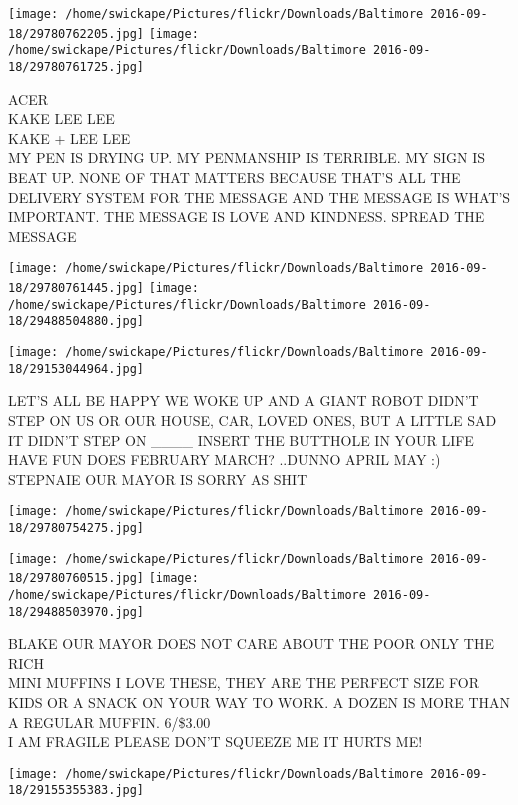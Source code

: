 \documentclass[10pt,letterpaper]{article}
\begin{document}
\texttt{[image: /home/swickape/Pictures/flickr/Downloads/Baltimore 2016-09-18/29780762205.jpg]}
\texttt{[image: /home/swickape/Pictures/flickr/Downloads/Baltimore 2016-09-18/29780761725.jpg]}

ACER\\
KAKE LEE LEE\\
KAKE + LEE LEE\\
MY PEN IS DRYING UP.  MY PENMANSHIP IS TERRIBLE.  MY SIGN IS BEAT UP.  NONE OF THAT MATTERS BECAUSE THAT'S ALL THE DELIVERY SYSTEM FOR THE MESSAGE AND THE MESSAGE IS WHAT'S IMPORTANT.  THE MESSAGE IS LOVE AND KINDNESS.  SPREAD THE MESSAGE\\
\pagebreak

\texttt{[image: /home/swickape/Pictures/flickr/Downloads/Baltimore 2016-09-18/29780761445.jpg]}
\texttt{[image: /home/swickape/Pictures/flickr/Downloads/Baltimore 2016-09-18/29488504880.jpg]}

\vspace{0.25in}
\texttt{[image: /home/swickape/Pictures/flickr/Downloads/Baltimore 2016-09-18/29153044964.jpg]}

LET'S ALL BE HAPPY WE WOKE UP AND A GIANT ROBOT DIDN'T STEP ON US OR OUR HOUSE, CAR, LOVED ONES, BUT A LITTLE SAD IT DIDN'T STEP ON \_\_\_\_ INSERT THE BUTTHOLE IN YOUR LIFE\\
HAVE FUN DOES FEBRUARY MARCH?  ..DUNNO APRIL MAY :)\\
STEPNAIE OUR MAYOR IS SORRY AS SHIT\\
\pagebreak

\texttt{[image: /home/swickape/Pictures/flickr/Downloads/Baltimore 2016-09-18/29780754275.jpg]}

\vspace{0.25in}
\texttt{[image: /home/swickape/Pictures/flickr/Downloads/Baltimore 2016-09-18/29780760515.jpg]}
\texttt{[image: /home/swickape/Pictures/flickr/Downloads/Baltimore 2016-09-18/29488503970.jpg]}

BLAKE OUR MAYOR DOES NOT CARE ABOUT THE POOR ONLY THE RICH\\
MINI MUFFINS I LOVE THESE, THEY ARE THE PERFECT SIZE FOR KIDS OR A SNACK ON YOUR WAY TO WORK.  A DOZEN IS MORE THAN A REGULAR MUFFIN.  6/\$3.00\\
I AM FRAGILE PLEASE DON'T SQUEEZE ME IT HURTS ME!\\
\pagebreak

\texttt{[image: /home/swickape/Pictures/flickr/Downloads/Baltimore 2016-09-18/29155355383.jpg]}
\end{document}
